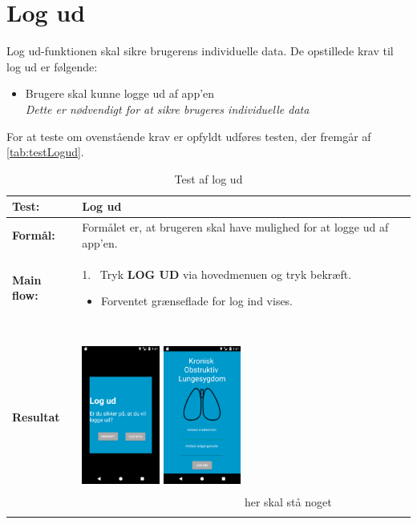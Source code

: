 \section{Log ud}
Log ud-funktionen skal sikre brugerens individuelle data. De opstillede krav til log ud er følgende:
\begin{itemize}
\item Brugere skal kunne logge ud af app’en
\\
\textit{Dette er nødvendigt for at sikre brugeres individuelle data}
\end{itemize}

\noindent
For at teste om ovenstående krav er opfyldt udføres testen, der fremgår af \autoref{tab:testLogud}.

  \begin{longtable}{ | l | p{13cm} |} \hline
    \textbf{Test:} & Log ud \\ \hline
  \textbf{Formål:} & Formålet er, at brugeren skal have mulighed for at logge ud af app’en.
 \\ \hline
 	\textbf{Main flow:} & 1.~ Tryk \textbf{LOG UD} via hovedmenuen og tryk bekræft.
 	\begin{itemize} [label={\checkmark}]
 	\item Forventet grænseflade for log ind vises.
 	\end{itemize}	
\\ \hline
\textbf{Resultat} &  \hspace{22mm}  \raisebox{-\totalheight}    {\includegraphics[width=0.24\textwidth, height=60mm]{figures/test/logud}} 
\hspace{5mm}
        \raisebox{-\totalheight}
    {\includegraphics[width=0.24\textwidth, height=60mm]{figures/test/logud1}} \vspace{3mm}
       \newline
       her skal stå noget
\\ \hline
   \caption{Test af log ud}
    \label{tab:testLogud}
\end{longtable}





